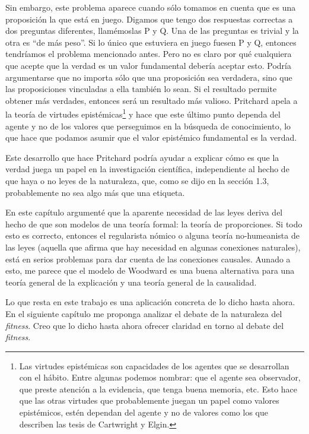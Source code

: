Sin embargo, este problema aparece cuando sólo tomamos en cuenta que es una proposición la que está en juego. Digamos que tengo dos respuestas correctas a dos preguntas diferentes, llamémoslas P y Q. Una de las preguntas es trivial y la otra es ``de más peso''. Si lo único que estuviera en juego fuesen P y Q, entonces tendríamos el problema mencionado antes. Pero no es claro por qué cualquiera que acepte que la verdad es un valor fundamental debería aceptar esto. Podría argumentarse que no importa sólo que una proposición sea verdadera, sino que las proposiciones vinculadas a ella también lo sean. Si el resultado permite obtener más verdades, entonces será un resultado más valioso. Pritchard apela a la teoría de virtudes epistémicas\footnote{Las virtudes epistémicas son capacidades de los agentes que se desarrollan con el hábito. Entre algunas podemos nombrar: que el agente sea observador, que preste atención a la evidencia, que tenga buena memoria, etc. Esto hace que las otras virtudes que probablemente juegan un papel como valores epistémicos, estén dependan del agente y no de valores como los que describen las tesis de Cartwright y Elgin.} y hace que este último punto dependa del agente y no de los valores que perseguimos en la búsqueda de conocimiento, lo que hace que podamos asumir que el valor epistémico fundamental es la verdad.

Este desarrollo que hace Pritchard podría ayudar a explicar cómo es que la verdad juega un papel en la investigación científica, independiente al hecho de que haya o no leyes de la naturaleza, que, como se dijo en la sección 1.3, probablemente no sea algo más que una etiqueta.

En este capítulo argumenté que la aparente necesidad de las leyes deriva del hecho de que son modelos de una teoría formal: la teoría de proporciones. Si todo esto es correcto, entonces el regularista nómico o alguna teoría no-humeanista de las leyes (aquella que afirma que hay necesidad en algunas conexiones naturales), está en serios problemas para dar cuenta de las conexiones causales. Aunado a esto, me parece que el modelo de Woodward es una buena alternativa para una teoría general de la explicación y una teoría general de la causalidad.

Lo que resta en este trabajo es una aplicación concreta de lo dicho hasta ahora. En el siguiente capítulo me proponga analizar el debate de la naturaleza del \emph{fitness}. Creo que lo dicho hasta ahora ofrecer claridad en torno al debate del \emph{fitness}.
